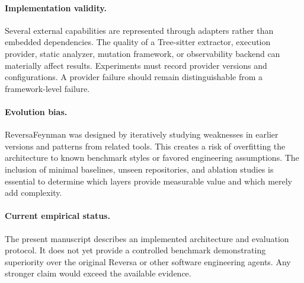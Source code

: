 \paragraph{Implementation validity.}
Several external capabilities are represented through adapters rather than embedded dependencies. The quality of a Tree-sitter extractor, execution provider, static analyzer, mutation framework, or observability backend can materially affect results. Experiments must record provider versions and configurations. A provider failure should remain distinguishable from a framework-level failure.

\paragraph{Evolution bias.}
ReversaFeynman was designed by iteratively studying weaknesses in earlier versions and patterns from related tools. This creates a risk of overfitting the architecture to known benchmark styles or favored engineering assumptions. The inclusion of minimal baselines, unseen repositories, and ablation studies is essential to determine which layers provide measurable value and which merely add complexity.

\paragraph{Current empirical status.}
The present manuscript describes an implemented architecture and evaluation protocol. It does not yet provide a controlled benchmark demonstrating superiority over the original Reversa or other software engineering agents. Any stronger claim would exceed the available evidence.